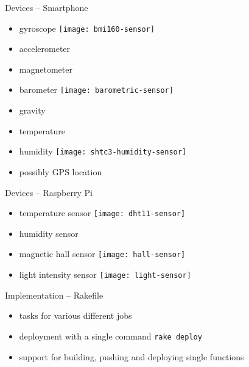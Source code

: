 \documentclass[aspectratio=169]{beamer}
\begin{document}
  
  

  \begin{frame}{Devices -- Smartphone}
    \begin{itemize}
      \item gyroscope
            \hspace*{2em}
            \texttt{[image: bmi160-sensor]}
      \item accelerometer
      \item magnetometer
      \item barometer
            \hspace*{2em}
            \texttt{[image: barometric-sensor]}
      \item gravity
      \item temperature
      \item humidity
            \hspace*{2em}
            \texttt{[image: shtc3-humidity-sensor]}
      \item possibly GPS location
    \end{itemize}
  \end{frame}

  \begin{frame}{Devices -- Raspberry Pi}
    \begin{itemize}
      \item temperature sensor
            \hspace*{2em}
            \texttt{[image: dht11-sensor]}
      \item humidity sensor
      \item magnetic hall sensor
            \hspace*{2em}
            \texttt{[image: hall-sensor]}
      \item light intensity sensor
            \hspace*{2em}
            \texttt{[image: light-sensor]}
    \end{itemize}
  \end{frame}

  

  

  \begin{frame}{Implementation -- Rakefile}
    \begin{itemize}
      \item tasks for various different jobs
      \item deployment with a single command \lstinline{rake deploy}
      \item support for building, pushing and deploying single functions
    \end{itemize}
  \end{frame}
\end{document}
